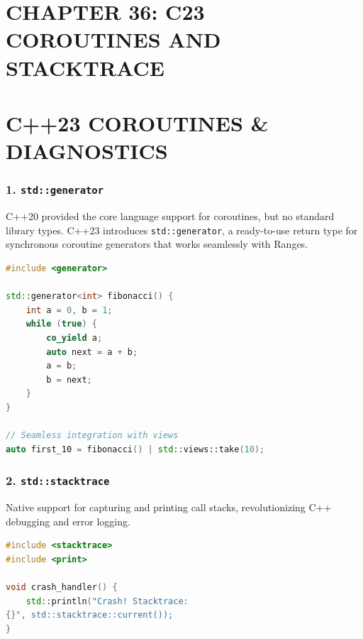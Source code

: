 \hypertarget{chapter-36-c23-coroutines-and-stacktrace}{%
\section{CHAPTER 36: C23 COROUTINES AND
STACKTRACE}\label{chapter-36-c23-coroutines-and-stacktrace}}

\hypertarget{c23-coroutines-diagnostics}{%
\section{C++23 COROUTINES \&
DIAGNOSTICS}\label{c23-coroutines-diagnostics}}

\hypertarget{stdgenerator}{%
\subsubsection{\texorpdfstring{1.
\texttt{std::generator}}{1. std::generator}}\label{stdgenerator}}

C++20 provided the core language support for coroutines, but no standard
library types. C++23 introduces
\passthrough{\lstinline!std::generator!}, a ready-to-use return type for
synchronous coroutine generators that works seamlessly with Ranges.

\begin{lstlisting}[language={C++}]
#include <generator>

std::generator<int> fibonacci() {
    int a = 0, b = 1;
    while (true) {
        co_yield a;
        auto next = a + b;
        a = b;
        b = next;
    }
}

// Seamless integration with views
auto first_10 = fibonacci() | std::views::take(10);
\end{lstlisting}

\hypertarget{stdstacktrace}{%
\subsubsection{\texorpdfstring{2.
\texttt{std::stacktrace}}{2. std::stacktrace}}\label{stdstacktrace}}

Native support for capturing and printing call stacks, revolutionizing
C++ debugging and error logging.

\begin{lstlisting}[language={C++}]
#include <stacktrace>
#include <print>

void crash_handler() {
    std::println("Crash! Stacktrace:
{}", std::stacktrace::current());
}
\end{lstlisting}
